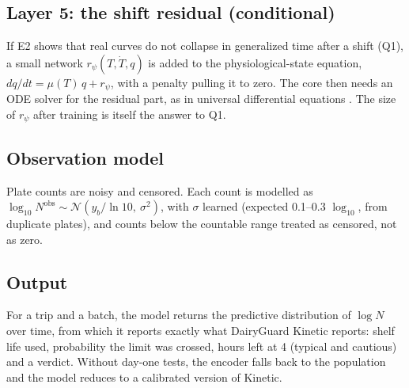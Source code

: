 \subsection{Layer 5: the shift residual (conditional)}
If E2 shows that real curves do not collapse in generalized time after a shift (Q1), a small network $r_\psi(T,\dot T,q)$ is added to the physiological-state equation, $dq/dt=\mu(T)\,q+r_\psi$, with a penalty pulling it to zero. The core then needs an ODE solver for the residual part, as in universal differential equations \cite{rackauckas2020,chen2018}. The size of $r_\psi$ after training is itself the answer to Q1.

\subsection{Observation model}
Plate counts are noisy and censored. Each count is modelled as $\log_{10}N^{\mathrm{obs}}\sim\mathcal N(y_b/\ln10,\ \sigma^2)$, with $\sigma$ learned (expected 0.1--0.3 $\log_{10}$, from duplicate plates), and counts below the countable range treated as censored, not as zero.

\subsection{Output}
For a trip and a batch, the model returns the predictive distribution of $\log N$ over time, from which it reports exactly what DairyGuard Kinetic reports: shelf life used, probability the limit was crossed, hours left at 4\degC{} (typical and cautious) and a verdict. Without day-one tests, the encoder falls back to the population and the model reduces to a calibrated version of Kinetic.

